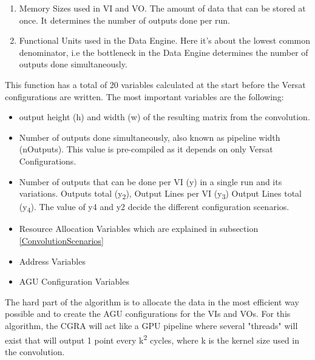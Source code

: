 \begin{enumerate}
	\item Memory Sizes used in VI and VO. The amount of data that can be stored at once. It determines the number of outputs done per run.
	\item Functional Units used in the Data Engine. Here it's about the lowest common denominator, i.e the bottleneck in the Data 
Engine determines the number of outputs done simultaneously.
  \end{enumerate}
 
This function has a total of 20 variables calculated at the start before the Versat configurations are written. The most important
variables are the following:

\begin{itemize}
	\item output height (h) and width (w) of the resulting matrix from the convolution.
	\item Number of outputs done simultaneously, also known as pipeline width (nOutputs). This value is pre-compiled as it depends on only Versat Configurations.
	\item Number of outputs that can be done per VI (y) in a single run and its variations. Outputs total (y\textsubscript{2}), Output Lines per VI (y\textsubscript{3}) Output Lines total (y\textsubscript{4}).
The value of y4 and y2 decide the different configuration scenarios.
	\item Resource Allocation Variables
which are explained in subsection \ref*{ConvolutionScenarios}
	\item Address Variables
	\item AGU Configuration Variables
  \end{itemize}

The hard part of the algorithm is to allocate the data in the most efficient way possible and to create the AGU configurations
for the VIs and VOs. For this algorithm, the CGRA will act like a GPU pipeline where several "threads" will exist
that will output 1 point every k\textsuperscript{2} cycles, where k is the kernel size used in the convolution.

